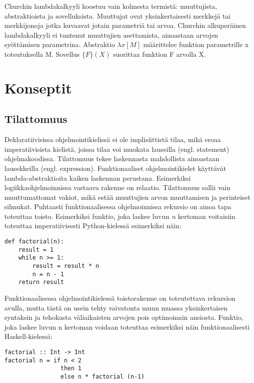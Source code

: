 Churchin lambdakalkyyli koostuu vain kolmesta termistä: muuttujista, abstraktioista ja sovelluksista.
Muuttujat ovat yksinkertaisesti merkkejä tai merkkijonoja jotka kuvaavat jotain parametriä tai arvoa. Churchin
alkuperäinen lambdakalkyyli ei tuntenut muuttujien asettamista, ainoastaan arvojen syöttämisen parametrina. Abstraktio
$ \lambda x [ M ] $ määrittelee funktion parametrille x toteutuksella M. Sovellus $ \{ F \} ( X ) $ suorittaa funktion F
arvolla X. \cite{lambdacalculus}

\section{Konseptit}

\subsection{Tilattomuus}
Deklaratiivisissa ohjelmointikielissä ei ole implisiittistä tilaa, mikä eroaa imperatiivisista kielistä, joissa tilaa
voi muokata lauseilla (engl. statement) ohjelmakoodissa. Tilattomuus tekee laskennasta mahdollista ainoastaan
lausekkeilla (engl. expression). Funktionaaliset ohjelmointikielet käyttävät lambda-abstraktioita kaiken laskennan
perustana. Esimerkiksi logiikkaohjelmoinnissa vastaava rakenne on relaatio. Tilattomuus sallii vain muuttumattomat
vakiot, mikä estää muuttujien arvon muuttamisen ja perinteiset silmukat. Puhtaasti funktionaalisessa ohjelmoinnissa
rekursio on ainoa tapa toteuttaa toisto. Esimerkiksi funktio, joka laskee luvun \textit{n} kertoman voitaisiin toteuttaa
imperatiivisesti Python-kielessä esimerkiksi näin:
\begin{verbatim}
def factorial(n):
    result = 1
    while n >= 1:
        result = result * n
        n = n - 1
    return result
\end{verbatim}
Funktionaalisessa ohjelmointikielessä toistorakenne on toteutettava rekursion avulla, mutta tästä on usein tehty
vaivatonta muun muassa yksinkertaisen syntaksin ja tehokasta väliaikaisten arvojen pois optimoinnin ansiosta.
\cite{hudak} Funktio, joka laskee luvun n kertoman voidaan toteuttaa esimerkiksi näin funktionaalisesti
Haskell-kielessä:
\begin{verbatim}
factorial :: Int -> Int
factorial n = if n < 2
                then 1
                else n * factorial (n-1)
\end{verbatim}

